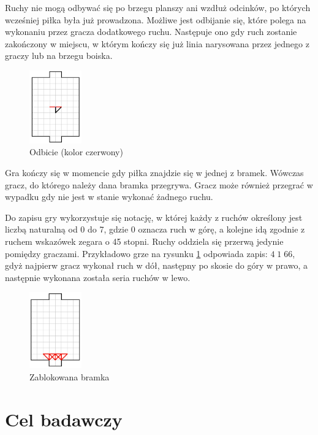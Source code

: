 \documentclass[licencjacka]{pracamgr}
\begin{document}
Ruchy nie mogą odbywać się po brzegu planszy ani wzdłuż odcinków, po których wcześniej piłka była już prowadzona.
Możliwe jest odbijanie się, które polega na wykonaniu przez gracza dodatkowego ruchu. Następuje ono gdy ruch zostanie zakończony w miejscu, w którym kończy się już linia narysowana przez jednego z graczy lub na brzegu boiska. 

\begin{figure}[ht]
  \centering
  \includegraphics[width=0.2\textwidth]{odbicie}
  \caption{Odbicie (kolor czerwony)}
  \label{fig:odbicie}
\end{figure}

Gra kończy się w momencie gdy piłka znajdzie się w jednej z bramek.
Wówczas gracz, do którego należy dana bramka przegrywa. 
Gracz może również przegrać w wypadku gdy nie jest w stanie wykonać żadnego ruchu.

Do zapisu gry wykorzystuje się notację, w której każdy z ruchów określony jest liczbą naturalną od 0 do 7, gdzie 0 oznacza ruch w górę, a kolejne idą zgodnie z ruchem wskazówek zegara o 45 stopni. Ruchy oddziela się przerwą jedynie pomiędzy graczami. Przykładowo grze na rysunku \ref{fig:odbicie} odpowiada zapis: $ 4 \;1 \; 66 $, gdyż najpierw gracz wykonał ruch w dół, następny po skosie do góry w prawo, a następnie wykonana została seria ruchów w lewo.

\begin{figure}[ht]
  \centering
  \includegraphics[width=0.2\textwidth]{zablokowanie}
  \caption{Zablokowana bramka}
\end{figure}
 
\section{Cel badawczy} 
\end{document}
